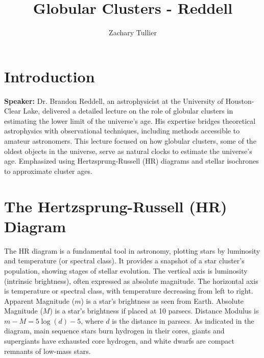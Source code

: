 \documentclass[12pt]{article}
\begin{document}
\singlespacing  %
\title{Globular Clusters - Reddell}

\author[1]{Zachary Tullier}
\date{}
\maketitle




\section{Introduction}
    \textbf{Speaker:} Dr. Brandon Reddell, an astrophysicist at the University of Houston-Clear Lake, delivered a detailed lecture on the role of globular clusters in estimating the lower limit of the universe's age. His expertise bridges theoretical astrophysics with observational techniques, including methods accessible to amateur astronomers. This lecture focused on how globular clusters, some of the oldest objects in the universe, serve as natural clocks to estimate the universe's age. Emphasized using Hertzsprung-Russell (HR) diagrams and stellar isochrones to approximate cluster ages.


\section{The Hertzsprung-Russell (HR) Diagram}
    The HR diagram is a fundamental tool in astronomy, plotting stars by luminosity and temperature (or spectral class). It provides a snapshot of a star cluster's population, showing stages of stellar evolution. The vertical axis is luminosity (intrinsic brightness), often expressed as absolute magnitude. The horizontal axis is temperature or spectral class, with temperature decreasing from left to right. Apparent Magnitude (\( m \)) is a star's brightness as seen from Earth. Absolute Magnitude (\( M \)) is a star's brightness if placed at 10 parsecs. Distance Modulus is \( m - M = 5 \log(d) - 5 \), where \( d \) is the distance in parsecs. As indicated in the diagram, main sequence stars burn hydrogen in their cores, giants and supergiants have exhausted core hydrogen, and white dwarfs are compact remnants of low-mass stars.
    
\end{document}
